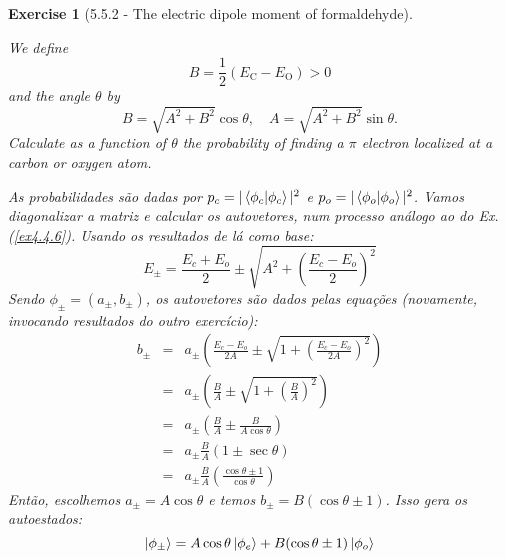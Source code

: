 \documentclass[12pt]{article}
\def\be{\begin{equation}}
\def\ee{\end{equation}}
\def\bea{\begin{eqnarray*}}
\def\eea{\end{eqnarray*}}
\def\f{\frac}
\def\l{\left}
\def\r{\right}
\newtheorem{exercise}{Exercise}
\begin{document}
\begin{exercise}[5.5.2 - The electric dipole moment of formaldehyde]
\begin{exercises}
			\item We define
			$$
			B=\frac{1}{2}\left(E_{\mathrm{C}}-E_{\mathrm{O}}\right)>0
			$$
			and the angle $\theta$ by
			$$
			B=\sqrt{A^{2}+B^{2}} \cos \theta, \quad A=\sqrt{A^{2}+B^{2}} \sin \theta .
			$$
			Calculate as a function of $\theta$ the probability of finding a $\pi$ electron localized at a carbon or oxygen atom.
			\begin{multianswer}
				As probabilidades são dadas por $p_c = |\braket{\phi_c | \phi_c}|^2$ e $p_o = |\braket{\phi_o | \phi_o}|^2$. Vamos diagonalizar a matriz e calcular os autovetores, num processo análogo ao do Ex.(\ref{ex4.4.6}). Usando os resultados de lá como base:
				\be
					E_{\pm} = \f{E_c + E_o}{2} \pm \sqrt{A^2 + \l(\f{E_c - E_o}{2}\r)^2}
				\ee
				Sendo $\phi_\pm = (a_\pm, b_\pm)$, os autovetores são dados pelas equações (novamente, invocando resultados do outro exercício):
				\bea
					b_\pm &=& a_\pm\l( \f{E_c - E_o}{2A} \pm \sqrt{1 + \l(\f{E_c - E_o}{2A}\r)^2}\r) \\
						&=& a_\pm \l( \f{B}{A} \pm \sqrt{1 + \l(\f{B}{A}\r)^2}\r) \\
						&=& a_\pm \l( \f{B}{A} \pm \f{B}{A\cos\theta}\r) \\
						&=& a_\pm \f{B}{A}( 1 \pm \sec\theta) \\
						&=& a_\pm \f{B}{A} \l( \f{\cos\theta \pm 1}{\cos\theta} \r)
				\eea
				Então, escolhemos $a_\pm = A\cos\theta$ e temos $b_\pm = B(\cos\theta\pm 1)$. Isso gera os autoestados:
				\be
					\ket{\phi_\pm} = A\cos\theta\ket{\phi_e} + B(\cos\theta\pm 1)\ket{\phi_o}
				\ee
				
				
			\end{multianswer}
			
			
			
			
		\end{exercises}		
	\end{exercise}
	
\end{document}

